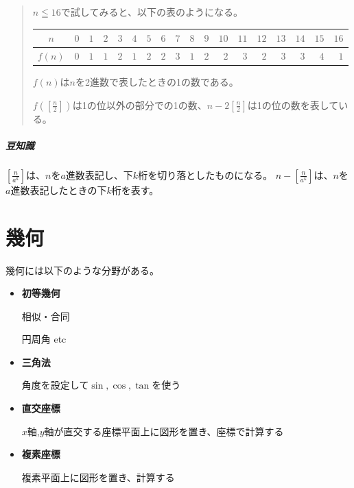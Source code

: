 \documentclass[uplatex,fleqn]{jsbook}
\begin{document}
\begin{quote}
    $n\leqq 16$で試してみると、以下の表のようになる。

    \begin{table}[h]
        \begin{tabular}{|c||r|r|r|r|r|r|r|r|r|r|r|r|r|r|r|r|r|}
            \hline
            $n$ & $0$ & $1$ & $2$ & $3$ & $4$ & $5$ & $6$ & $7$ & $8$ & $9$ & $10$ & $11$ & $12$ & $13$ & $14$ & $15$ & $16$\\\hline
            $f\left(n\right)$ & $0$ & $1$ & $1$ & $2$ & $1$ & $2$ & $2$ & $3$ & $1$ & $2$ & $2$ & $3$ & $2$ & $3$ & $3$ & $4$ & $1$\\\hline
        \end{tabular}
    \end{table}

    $f\left(n\right)$は$n$を2進数で表したときの1の数である。

    $\displaystyle f\left(\left[\frac{n}{2}\right]\right)$は1の位以外の部分での1の数、$\displaystyle n-2\left[\frac{n}{2}\right]$は1の位の数を表している。
\end{quote}
\paragraph{豆知識}$\displaystyle \left[\frac{n}{a^k}\right]$は、$n$を$a$進数表記し、下$k$桁を切り落としたものになる。
$\displaystyle n-\left[\frac{n}{a^k}\right]$は、$n$を$a$進数表記したときの下$k$桁を表す。

\chapter{幾何}
幾何には以下のような分野がある。
\begin{itemize}
    \item {\large \textbf{初等幾何}}

    相似・合同

    円周角 etc

    \item {\large \textbf{三角法}}

    角度を設定して$\sin,\cos,\tan$を使う

    \item {\large \textbf{直交座標}}

    $x$軸,$y$軸が直交する座標平面上に図形を置き、座標で計算する

    \item {\large \textbf{複素座標}}

    複素平面上に図形を置き、計算する
\end{itemize}
\end{document}
